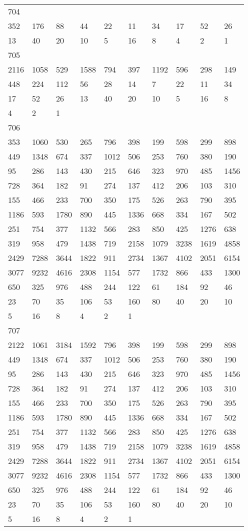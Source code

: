 \begin{longtable}{*{10}{l}}
704&&&&&&&&&\\
352& 176& 88& 44& 22& 11& 34& 17& 52& 26\\
13& 40& 20& 10& 5& 16& 8& 4& 2& 1\\

705&&&&&&&&&\\
2116& 1058& 529& 1588& 794& 397& 1192& 596& 298& 149\\
448& 224& 112& 56& 28& 14& 7& 22& 11& 34\\
17& 52& 26& 13& 40& 20& 10& 5& 16& 8\\
4& 2& 1& \\

706&&&&&&&&&\\
353& 1060& 530& 265& 796& 398& 199& 598& 299& 898\\
449& 1348& 674& 337& 1012& 506& 253& 760& 380& 190\\
95& 286& 143& 430& 215& 646& 323& 970& 485& 1456\\
728& 364& 182& 91& 274& 137& 412& 206& 103& 310\\
155& 466& 233& 700& 350& 175& 526& 263& 790& 395\\
1186& 593& 1780& 890& 445& 1336& 668& 334& 167& 502\\
251& 754& 377& 1132& 566& 283& 850& 425& 1276& 638\\
319& 958& 479& 1438& 719& 2158& 1079& 3238& 1619& 4858\\
2429& 7288& 3644& 1822& 911& 2734& 1367& 4102& 2051& 6154\\
3077& 9232& 4616& 2308& 1154& 577& 1732& 866& 433& 1300\\
650& 325& 976& 488& 244& 122& 61& 184& 92& 46\\
23& 70& 35& 106& 53& 160& 80& 40& 20& 10\\
5& 16& 8& 4& 2& 1& \\

707&&&&&&&&&\\
2122& 1061& 3184& 1592& 796& 398& 199& 598& 299& 898\\
449& 1348& 674& 337& 1012& 506& 253& 760& 380& 190\\
95& 286& 143& 430& 215& 646& 323& 970& 485& 1456\\
728& 364& 182& 91& 274& 137& 412& 206& 103& 310\\
155& 466& 233& 700& 350& 175& 526& 263& 790& 395\\
1186& 593& 1780& 890& 445& 1336& 668& 334& 167& 502\\
251& 754& 377& 1132& 566& 283& 850& 425& 1276& 638\\
319& 958& 479& 1438& 719& 2158& 1079& 3238& 1619& 4858\\
2429& 7288& 3644& 1822& 911& 2734& 1367& 4102& 2051& 6154\\
3077& 9232& 4616& 2308& 1154& 577& 1732& 866& 433& 1300\\
650& 325& 976& 488& 244& 122& 61& 184& 92& 46\\
23& 70& 35& 106& 53& 160& 80& 40& 20& 10\\
5& 16& 8& 4& 2& 1& \\


\end{longtable}
